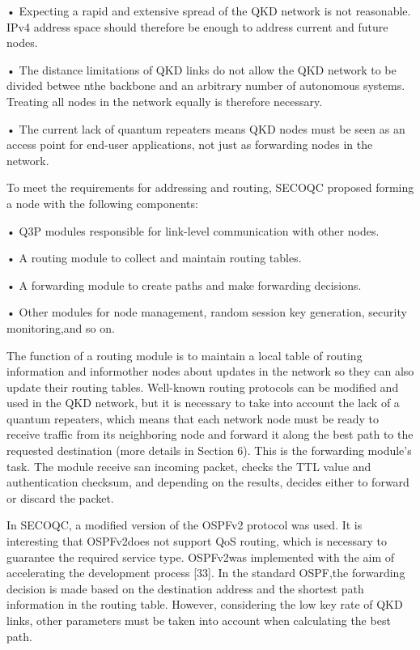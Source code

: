 • Expecting a rapid and extensive spread of the QKD network is not reasonable. IPv4 address space should therefore be enough to address current and future nodes.

• The distance limitations of QKD links do not allow the QKD network to be divided betwee nthe backbone and an arbitrary number of autonomous systems. Treating all nodes in the network equally is therefore necessary.

• The current lack of quantum repeaters means QKD nodes must be seen as an access point for end-user applications, not just as forwarding nodes in the network.

To meet the requirements for addressing and routing, SECOQC proposed forming a node with the following components:

• Q3P modules responsible for link-level communication with other nodes.

• A routing module to collect and maintain routing tables.

• A forwarding module to create paths and make forwarding decisions.

• Other modules for node management, random session key generation, security monitoring,and so on.

The function of a routing module is to maintain a local table of routing information and informother nodes about updates in the network so they can also update their routing tables. Well-known routing protocols can be modified and used in the QKD network, but it is necessary to take into account the lack of a quantum repeaters, which means that each network node must be ready to receive traffic from its neighboring node and forward it along the best path to the requested destination (more details in Section 6). This is the forwarding module’s task. The module receive san incoming packet, checks the TTL value and authentication checksum, and depending on the results, decides either to forward or discard the packet.

In SECOQC, a modified version of the OSPFv2 protocol was used. It is interesting that OSPFv2does not support QoS routing, which is necessary to guarantee the required service type. OSPFv2was implemented with the aim of accelerating the development process [33]. In the standard OSPF,the forwarding decision is made based on the destination address and the shortest path information in the routing table. However, considering the low key rate of QKD links, other parameters must be taken into account when calculating the best path.


